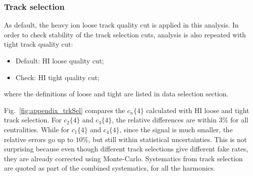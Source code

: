 \subsubsection{Track selection}
\label{sec:track_selection}

As default, the heavy ion loose track quality cut is applied in this analysis. In order to check stability of the track selection cuts, analysis is also repeated with tight track quality cut:
\begin{itemize}
\item Default: HI loose quality cut;
\item Check: HI tight quality cut;
\end{itemize}
where the definitions of loose and tight are listed in data selection section.

Fig.~\ref{fig:appendix_trkSel} compares the $c_n\{4\}$ calculated with HI loose and tight track selection. For $c_2\{4\}$ and $c_3\{4\}$, the relative differences are within $3\%$ for all centralities. While for $c_1\{4\}$ and $c_4\{4\}$, since the signal is much smaller, the relative errors go up to $10\%$, but still within statistical uncertainties. This is not surprising because even though different track selections give different fake rates, they are already corrected using Monte-Carlo. Systematics from track selection are quoted as part of the combined systematics, for all the harmonics.
